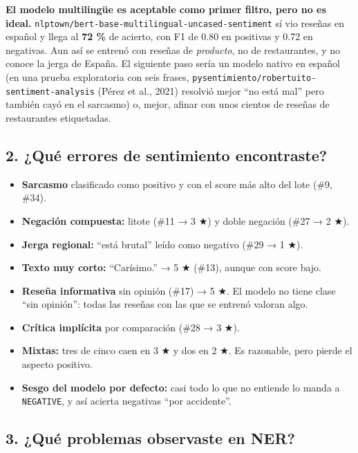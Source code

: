 \documentclass[12pt,a4paper]{article}
\begin{document}
\textbf{El modelo multilingüe es aceptable como primer filtro, pero no es ideal.}
\texttt{nlptown/bert-base-multilingual-uncased-sentiment} sí vio reseñas en español y llega al \textbf{72 \%} de
acierto, con F1 de 0.80 en positivas y 0.72 en negativas. Aun así se entrenó con reseñas de
\emph{producto}, no de restaurantes, y no conoce la jerga de España. El siguiente paso sería un modelo
nativo en español (en una prueba exploratoria con seis frases,
\texttt{pysentimiento/robertuito-sentiment-analysis} (Pérez et al., 2021) resolvió mejor ``no está mal'' pero también cayó en
el sarcasmo) o, mejor, afinar con unos cientos de reseñas de restaurantes etiquetadas.

\subsection{2. ¿Qué errores de sentimiento encontraste?}

\begin{itemize}[leftmargin=1.2em]
\item
  \textbf{Sarcasmo} clasificado como positivo y con el score más alto del lote (\#9, \#34).
\item
  \textbf{Negación compuesta:} litote (\#11 → 3 ★) y doble negación (\#27 → 2 ★).
\item
  \textbf{Jerga regional:} ``está brutal'' leído como negativo (\#29 → 1 ★).
\item
  \textbf{Texto muy corto:} ``Carísimo.'' → 5 ★ (\#13), aunque con score bajo.
\item
  \textbf{Reseña informativa} sin opinión (\#17) → 5 ★. El modelo no tiene clase ``sin opinión'': todas las
  reseñas con las que se entrenó valoran algo.
\item
  \textbf{Crítica implícita} por comparación (\#28 → 3 ★).
\item
  \textbf{Mixtas:} tres de cinco caen en 3 ★ y dos en 2 ★. Es razonable, pero pierde el aspecto positivo.
\item
  \textbf{Sesgo del modelo por defecto:} casi todo lo que no entiende lo manda a \texttt{NEGATIVE}, y así acierta
  negativas ``por accidente''.
\end{itemize}

\subsection{3. ¿Qué problemas observaste en NER?}
\end{document}
